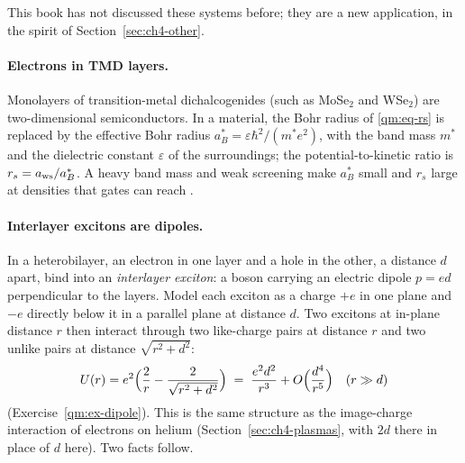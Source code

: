 This book has not discussed these systems before; they are a new application, in the spirit of
Section~\ref{sec:ch4-other}.

\paragraph{Electrons in TMD layers.} Monolayers of transition-metal dichalcogenides (such as MoSe$_2$ and WSe$_2$)
are two-dimensional semiconductors. In a material, the Bohr radius of \eqref{qm:eq-rs} is replaced by the effective
Bohr radius $a_B^\ast=\varepsilon\hbar^2/(m^\ast e^2)$, with the band mass $m^\ast$ and the dielectric constant
$\varepsilon$ of the surroundings; the potential-to-kinetic ratio is $r_s=a_{\rm ws}/a_B^\ast$. A heavy band mass and
weak screening make $a_B^\ast$ small and $r_s$ large at densities that gates can reach \tierC. %

\paragraph{Interlayer excitons are dipoles.} In a heterobilayer, an electron in one layer and a hole in the other,
a distance $d$ apart, bind into an \emph{interlayer exciton}: a boson carrying an electric dipole $p=ed$
perpendicular to the layers. Model each exciton as a charge $+e$ in one plane and $-e$ directly below it in a
parallel plane at distance $d$. Two excitons at in-plane distance $r$ then interact through two like-charge pairs at
distance $r$ and two unlike pairs at distance $\sqrt{r^2+d^2}$:
\begin{equation}\label{qm:eq-exciton}
U(r)=e^2\Bigl(\frac2r-\frac2{\sqrt{r^2+d^2}}\Bigr)\;=\;\frac{e^2d^2}{r^3}+O\Bigl(\frac{d^4}{r^5}\Bigr)\quad(r\gg d)
\end{equation}
(Exercise~\ref{qm:ex-dipole}). This is the same structure as the image-charge interaction of electrons on helium
(Section~\ref{sec:ch4-plasmas}, with $2d$ there in place of $d$ here). Two facts follow.

